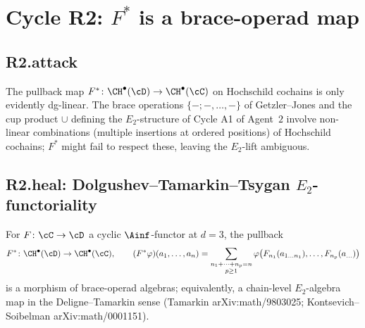 \section*{Cycle R2: $F^*$ is a brace-operad map}

\subsection*{R2.attack}

The pullback map $F^* \colon \CH^\bullet(\cD) \to \CH^\bullet(\cC)$ on
Hochschild cochains is only evidently dg-linear.  The brace
operations $\{-;-, \ldots, -\}$ of Getzler--Jones and the cup product
$\cup$ defining the $E_2$-structure of Cycle A1 of Agent~$2$ involve
non-linear combinations (multiple insertions at ordered positions) of
Hochschild cochains; $F^*$ might fail to respect these, leaving the
$E_2$-lift ambiguous.

\subsection*{R2.heal: Dolgushev--Tamarkin--Tsygan $E_2$-functoriality}

\begin{proposition}
\label{prop:F-star-E2-map}
\ClaimStatusProvedHere
For $F \colon \cC \to \cD$ a cyclic $\Ainf$-functor at $d = 3$, the
pullback
\[
  F^* \colon \CH^\bullet(\cD) \to \CH^\bullet(\cC),
  \qquad (F^* \varphi)(a_1, \ldots, a_n)
  = \sum_{\substack{n_1+\cdots+n_p = n \\ p \geq 1}}
    \varphi\bigl(F_{n_1}(a_{1\ldots n_1}), \ldots,
                 F_{n_p}(a_{\ldots})\bigr)
\]
is a morphism of brace-operad algebras; equivalently, a chain-level
$E_2$-algebra map in the Deligne--Tamarkin sense
(Tamarkin arXiv:math/9803025; Kontsevich--Soibelman arXiv:math/0001151).
\end{proposition}

